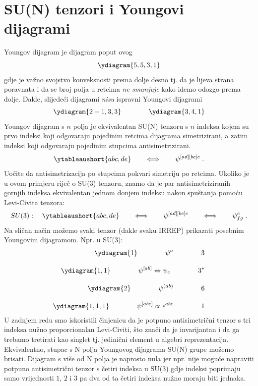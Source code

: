 \section{SU(N) tenzori i Youngovi dijagrami}

Youngov dijagram je dijagram poput ovog
$$
\ydiagram{5,5,3,1}
$$
gdje je važno svojstvo konveksnosti prema dolje desno tj. da
je lijeva strana poravnata i da se broj polja u retcima
\emph{ne smanjuje} kako idemo odozgo prema dolje.
Dakle, slijedeći dijagrami \emph{nisu} ispravni Youngovi dijagrami
$$
\ydiagram{2+1,3,3} \qquad  \qquad  \ydiagram{3,4,1}
$$
Youngov dijagram s $n$ polja je ekvivalentan SU(N) tenzoru s
$n$ indeksa kojem su prvo indeksi koji odgovaraju pojedinim
retcima dijagrama simetrizirani, a zatim indeksi koji odgovaraju
pojedinim stupcima antisimetrizirani.
\begin{equation}
\ytableaushort{abc, de} \qquad \Longleftrightarrow \qquad
\psi^{[ad][be]c} \;.
\label{eq:tbltensor}
\end{equation}
Uočite da antisimetrizacija po stupcima pokvari simetriju po retcima.
Ukoliko je u ovom primjeru riječ o SU(3) tenzoru, znamo da je par
antisimetriziranih gornjih indeksa ekvivalentan jednom donjem indeksu
nakon spuštanja pomoću Levi-Civita tenzora:
\begin{equation}
SU(3):\quad 
\ytableaushort{abc, de} \qquad \Longleftrightarrow \qquad
\psi^{[ad][be]c} \qquad \Longleftrightarrow \qquad
\psi^{c}_{fg} \;.
\label{eq:tbltensorsu3}
\end{equation}
Na sličan način možemo svaki tenzor (dakle svaku IRREP) prikazati
posebnim Youngovim dijagramom. Npr. u SU(3):
\begin{align}
\ydiagram{1} \qquad\qquad \psi^a \qquad\qquad 3  \\[2ex]
\ydiagram{1,1} \qquad\qquad \psi^{[ab]} \Leftrightarrow \psi_c  \qquad\qquad 3^*  \\[2ex]
\ydiagram{2} \qquad\qquad \psi^{(ab)}  \qquad\qquad 6  \\[2ex]
\ydiagram{1,1,1} \qquad\qquad \psi^{[abc]} \propto \epsilon^{abc} \qquad\qquad 1
\end{align}
U zadnjem redu smo iskoristili činjenicu da je potpuno antisimetrični tenzor s tri
indeksa nužno proporcionalan Levi-Civiti, što znači da je invarijantan i
da ga trebamo tretirati kao singlet tj. jedinični element u algebri
reprezentacija. Ekvivalentno, stupac s N polja
Youngovog dijagrama SU(N) grupe možemo brisati. Dijagram s više od N polja
je naprosto nula jer npr. nije moguće napraviti potpuno antisimetrični tenzor
s četiri indeksa u SU(3) gdje indeksi poprimaju
samo vrijednosti $1$, $2$ i $3$ pa dva od ta četiri indeksa nužno moraju
biti jednaka.


